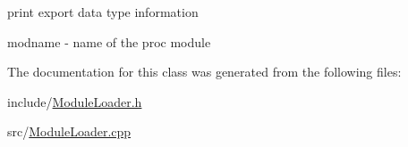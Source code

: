 print export data type information 

\begin{DoxyItemize}
\item {\ttfamily modname} -\/ name of the proc module \end{DoxyItemize}


The documentation for this class was generated from the following files\+:\begin{DoxyCompactItemize}
\item 
include/\hyperlink{ModuleLoader_8h}{Module\+Loader.\+h}\item 
src/\hyperlink{ModuleLoader_8cpp}{Module\+Loader.\+cpp}\end{DoxyCompactItemize}
